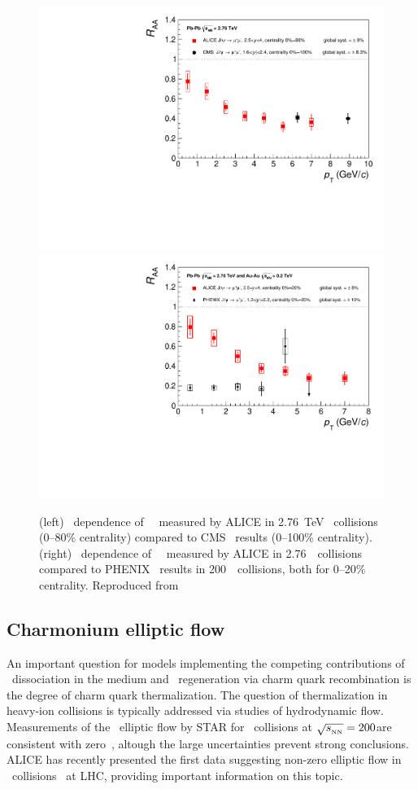 \begin{figure}[h!]
\begin{center}
\includegraphics[width=0.49\linewidth,keepaspectratio]{qqbarfigures/RAAPtvsModels1.pdf}
\includegraphics[width=0.49\linewidth,keepaspectratio]{qqbarfigures/RAAPtvsModels2.pdf}
\caption{ \label{fig:GR:raaexp2}
(left) \pT\ dependence of \jpsi\ \Raa\ measured by ALICE in 2.76~TeV \PbPb\
collisions (0--80\% centrality) compared to CMS~\cite{Chatrchyan:2012np}
results (0--100\% centrality).
(right) \pT\ dependence of \jpsi\ \Raa\ measured by ALICE 
in 2.76\TeV\ \PbPb\ collisions compared to PHENIX~\cite{Adare:2011yf}
results in 200\GeV\ \AuAu\ collisions, both for 0--20\% centrality.  Reproduced from~\cite{Abelev:2013ila}}
\end{center}
\end{figure}


\subsection{Charmonium elliptic flow}

An important question for models implementing the competing contributions of
\jpsi\ dissociation in the medium and \jpsi\ regeneration via charm quark recombination is
the degree of charm quark thermalization. The question of thermalization in heavy-ion 
collisions is typically addressed
via studies of hydrodynamic flow. 
Measurements of the \jpsi\ elliptic flow by STAR for \AuAu\ collisions at 
$\sqrt{s_{_{\rm NN}}} = 200$\GeV are consistent with zero~\cite{Adamczyk:2012pw}, 
altough the large uncertainties prevent strong conclusions.
ALICE has recently presented the first data 
suggesting non-zero elliptic flow in \PbPb\ collisions~\cite{ALICE:2013xna} at LHC, 
providing important information on this topic.

